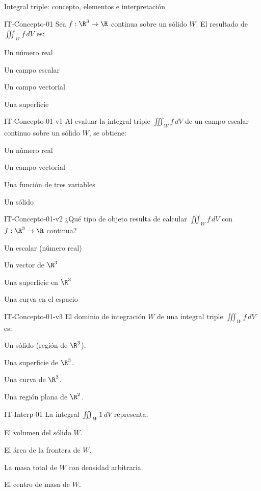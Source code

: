 \documentclass[a4,11pt]{aleph-notas}
\begin{document}
\begin{quiz}{Integral triple: concepto, elementos e interpretación}

\begin{multi}[]%
    {IT-Concepto-01}
    Sea $f:\R^3\to\R$ continua sobre un sólido $W$. El resultado de $\displaystyle\iiint_W f\,dV$ es:
    \item* Un número real
    \item Un campo escalar
    \item Un campo vectorial
    \item Una superficie
\end{multi}

\begin{multi}[]%
    {IT-Concepto-01-v1}
    Al evaluar la integral triple $\displaystyle\iiint_W f\,dV$ de un campo escalar continuo sobre un sólido $W$, se obtiene:
    \item* Un número real
    \item Un campo vectorial
    \item Una función de tres variables
    \item Un sólido
\end{multi}

\begin{multi}[]%
    {IT-Concepto-01-v2}
    ¿Qué tipo de objeto resulta de calcular $\displaystyle\iiint_W f\,dV$ con $f:\R^3\to\R$ continua?
    \item* Un escalar (número real)
    \item Un vector de $\R^3$
    \item Una superficie en $\R^3$
    \item Una curva en el espacio
\end{multi}

\begin{multi}[]%
    {IT-Concepto-01-v3}
    El dominio de integración $W$ de una integral triple $\displaystyle\iiint_W f\,dV$ es:
    \item* Un sólido (región de $\R^3$).
    \item Una superficie de $\R^3$.
    \item Una curva de $\R^3$.
    \item Una región plana de $\R^2$.
\end{multi}

\begin{multi}[]%
    {IT-Interp-01}
    La integral $\displaystyle\iiint_W 1\,dV$ representa:
    \item* El volumen del sólido $W$.
    \item El área de la frontera de $W$.
    \item La masa total de $W$ con densidad arbitraria.
    \item El centro de masa de $W$.
\end{multi}


\end{quiz}
\end{document}
